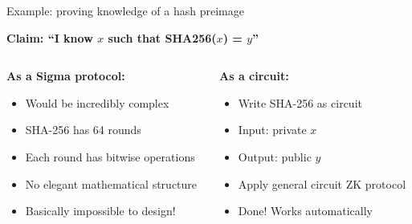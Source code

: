 \documentclass[aspectratio=169, lualatex, handout]{beamer}
\begin{document}
\begin{frame}{Example: proving knowledge of a hash preimage}
	\begin{center}
		\textbf{Claim: ``I know $x$ such that SHA256($x$) = $y$''}
	\end{center}
	\vspace{0.5em}
	\begin{columns}[c]
		\begin{column}{0.5\textwidth}
			\textbf{As a Sigma protocol:}
			\begin{itemize}
				\item Would be incredibly complex
				\item SHA-256 has 64 rounds
				\item Each round has bitwise operations
				\item No elegant mathematical structure
				\item Basically impossible to design!
			\end{itemize}
		\end{column}
		\begin{column}{0.5\textwidth}
			\textbf{As a circuit:}
			\begin{itemize}
				\item Write SHA-256 as circuit
				\item Input: private $x$
				\item Output: public $y$
				\item Apply general circuit ZK protocol
				\item Done! Works automatically
			\end{itemize}
		\end{column}
	\end{columns}
\end{frame}
\end{document}
